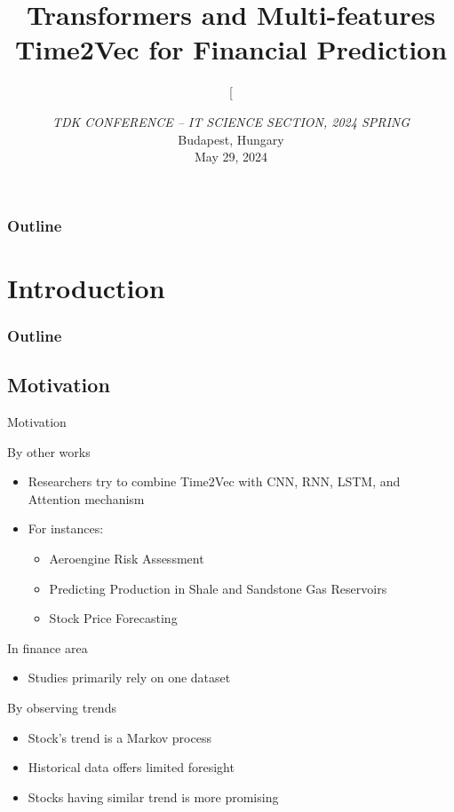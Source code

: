 \documentclass[compress, mathserif, fleqn, 10pt]{beamer}
\title{Transformers and Multi-features Time2Vec for Financial Prediction}
\author{[}
\date{\scriptsize \emph{TDK CONFERENCE – IT SCIENCE SECTION, 2024 SPRING}\\
	\bigskip
	Budapest, Hungary\\ May 29, 2024}
\begin{document}
	\abovedisplayskip=1pt \belowdisplayskip=2pt \abovedisplayshortskip=1pt \belowdisplayshortskip=2pt
	
	\begin{frame}
		\titlepage
	\end{frame}
	
	\begin{frame}
		\frametitle{Outline}
		\tableofcontents
	\end{frame}
	
	\section{Introduction}
	\begin{frame}
		\frametitle{Outline}
		\tableofcontents[currentsection]
	\end{frame}
	
	\subsection{Motivation}
	\begin{frame}{Motivation}
		\begin{block}{By other works}
			\begin{itemize}
				\item Researchers try to combine Time2Vec with CNN, RNN, LSTM, and
				Attention mechanism
				
				\item For instances:
				
				\begin{itemize}
					\item Aeroengine Risk Assessment
					
					\item Predicting Production in Shale and Sandstone Gas Reservoirs
					
					\item Stock Price Forecasting
				\end{itemize}
			\end{itemize}
		\end{block}
		\smallskip
		\begin{block}{In finance area}
			\begin{itemize}
				\item Studies primarily rely on one dataset
			\end{itemize}
		\end{block}
		\smallskip
		\begin{block}{By observing trends}
			\begin{itemize}
				\item Stock's trend is a Markov process
				
				\item Historical data offers limited foresight
				
				\item Stocks having similar trend is more promising
			\end{itemize}
		\end{block}
	\end{frame}
	
\end{document}
